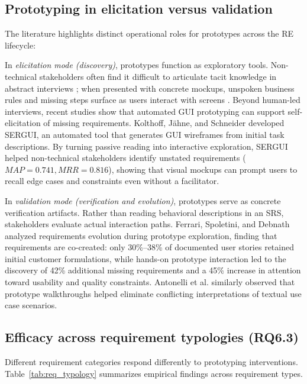\subsection{Prototyping in elicitation versus validation}
The literature highlights distinct operational roles for prototypes across the RE lifecycle:

In \textit{elicitation mode (discovery)}, prototypes function as exploratory tools. Non-technical stakeholders often find it difficult to articulate tacit knowledge in abstract interviews \cite{ferrari2016ambiguity}; when presented with concrete mockups, unspoken business rules and missing steps surface as users interact with screens \cite{hickey1998prototyping}. Beyond human-led interviews, recent studies show that automated GUI prototyping can support self-elicitation of missing requirements. Kolthoff, J{\"a}hne, and Schneider \cite{kolthoff2024selfelicitation} developed SERGUI, an automated tool that generates GUI wireframes from initial task descriptions. By turning passive reading into interactive exploration, SERGUI helped non-technical stakeholders identify unstated requirements ($MAP = 0.741, MRR = 0.816$), showing that visual mockups can prompt users to recall edge cases and constraints even without a facilitator.

In \textit{validation mode (verification and evolution)}, prototypes serve as concrete verification artifacts. Rather than reading behavioral descriptions in an SRS, stakeholders evaluate actual interaction paths. Ferrari, Spoletini, and Debnath \cite{rej2022evolve} analyzed requirements evolution during prototype exploration, finding that requirements are co-created: only 30\%--38\% of documented user stories retained initial customer formulations, while hands-on prototype interaction led to the discovery of 42\% additional missing requirements and a 45\% increase in attention toward usability and quality constraints. Antonelli et al. \cite{antonelli2022iterative} similarly observed that prototype walkthroughs helped eliminate conflicting interpretations of textual use case scenarios.

\subsection{Efficacy across requirement typologies (RQ6.3)}
Different requirement categories respond differently to prototyping interventions. Table~\ref{tab:req_typology} summarizes empirical findings across requirement types.

